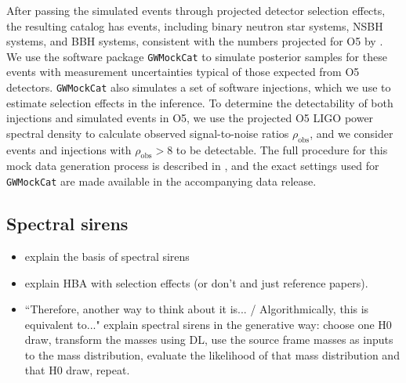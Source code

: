 \documentclass[]{aastex631}
\begin{document}
After passing the simulated events through projected detector selection effects, the resulting catalog has  events, including  binary neutron star systems,  NSBH systems, and  BBH systems, consistent with the numbers projected for O5 by \citet{kiendrebogo_observing_2023}.
We use the software package \texttt{GWMockCat} \citep{farah_things_2023} to simulate posterior samples for these events with measurement uncertainties typical of those expected from O5 detectors.
\texttt{GWMockCat} also simulates a set of software injections, which we use to estimate selection effects in the inference.
To determine the detectability of both injections and simulated events in O5, we use the projected O5 LIGO power spectral density \citep{dcc page} to calculate observed signal-to-noise ratios $\rho_{\text{obs}}$, and we consider events and injections with $\rho_{\text{obs}}>8$ to be detectable. 
The full procedure for this mock data generation process is described in \citet{fishbach_where, farah_things_2023, essick_dagnabbit_2023}, and the exact settings used for \texttt{GWMockCat} are made available in the accompanying data release. 

\subsection{Spectral sirens}
\label{sec:ss}
\begin{itemize}
    \item explain the basis of spectral sirens
    \item explain HBA with selection effects (or don't and just reference papers).
    \item ``Therefore, another way to think about it is... / Algorithmically, this is equivalent to..." explain spectral sirens in the generative way: choose one H0 draw, transform the masses using DL, use the source frame masses as inputs to the mass distribution, evaluate the likelihood of that mass distribution and that H0 draw, repeat.
\end{itemize}
\end{document}
